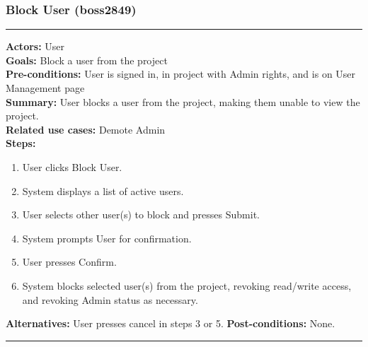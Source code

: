\documentclass[11pt]{report}
\begin{document}
\subsubsection{Block User (boss2849)}
\vspace{2pt}
\hrule
\vspace{8pt}
 \textbf{Actors:} User \\ 
 \textbf{Goals:} Block a user from the project \\
 \textbf{Pre-conditions:} User is signed in, in project with Admin rights, and is on User Management page \\
 \textbf{Summary:} User blocks a user from the project, making them unable to view the project. \\ 
 \textbf{Related use cases:} Demote Admin \\ 
 \textbf{Steps:} \begin{enumerate}
  \item User clicks Block User.
  \item System displays a list of active users.
  \item User selects other user(s) to block and presses Submit.
  \item System prompts User for confirmation.
  \item User presses Confirm.
  \item System blocks selected user(s) from the project, revoking read/write access, and revoking Admin status as necessary.
 \end{enumerate}
 \textbf{Alternatives:} User presses cancel in steps 3 or 5.
 \textbf{Post-conditions:} None. \\
 \vspace{8pt}
\hrule
\end{document}
